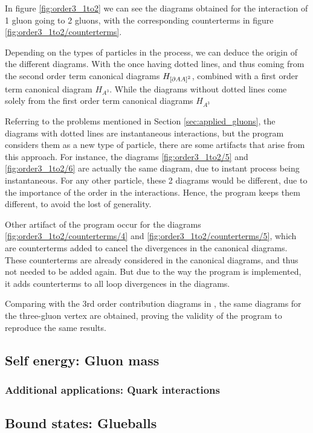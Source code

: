 \documentclass[11pt,a4paper,twoside,pdf]{article}
\numberwithin{equation}{section}
\begin{document}
In figure \ref{fig:order3_1to2} we can see the diagrams obtained for the interaction
of 1 gluon going to 2 gluons, with the corresponding counterterms in figure
\ref{fig:order3_1to2/counterterms}. 

Depending on the types of particles in the process, we can deduce the origin of the 
different diagrams. With the once having dotted lines, and thus coming from the second
order term canonical diagrams $H_{\left[ \partial A A \right]^2}$, combined with a first 
order term canonical diagram $H_{A^3}$. While the diagrams without dotted lines
come solely from the first order term canonical diagrams $H_{A^3}$

Referring to the problems mentioned in Section \ref{sec:applied_gluons}, the diagrams 
with dotted lines are instantaneous interactions, but the program considers them
as a new type of particle, there are some artifacts that arise from this
approach. For instance, the diagrams \ref{fig:order3_1to2/5} and \ref{fig:order3_1to2/6} are actually the same 
diagram, due to instant process being instantaneous. For any other particle, these 
2 diagrams would be different, due to the importance of the order in the interactions.
Hence, the program keeps them different, to avoid the lost of generality.

Other artifact of the program occur for the diagrams \ref{fig:order3_1to2/counterterms/4} and
\ref{fig:order3_1to2/counterterms/5}, which are counterterms added to cancel the divergences
in the canonical diagrams. These counterterms are already considered in the canonical diagrams, 
and thus not needed to be added again. But due to the way the program is implemented,
it adds counterterms to all loop divergences in the diagrams.

Comparing with the 3rd order contribution diagrams in \cite{QCDG}, the same diagrams
for the three-gluon vertex are obtained, proving the validity of the program to reproduce the same results.

\subsection{Self energy: Gluon mass}

\subsubsection{Additional applications: Quark interactions}

\subsection{Bound states: Glueballs}
\end{document}
